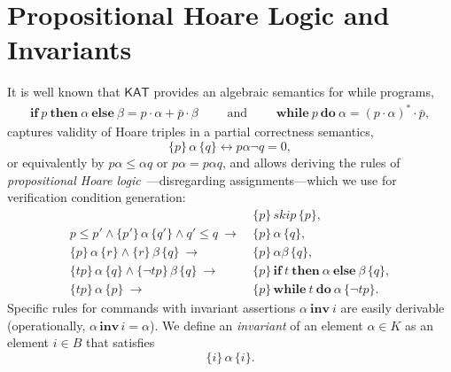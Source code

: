 \documentclass[envcountsames]{llncs}
\newcommand{\IF}[3]{\mathbf{if}\ #1\ \mathbf{then}\ #2\ \mathbf{else}\ #3}
\newcommand{\WHILE}[2]{\mathbf{while}\ #1\ \mathbf{do}\ #2}
\newcommand{\sskip}{\mathit{skip}}
\newcommand{\KAT}{\mathsf{KAT}}
\begin{document}

\section{Propositional Hoare Logic and Invariants}\label{sec:hl-invariants}

It is well known that $\KAT$ provides an algebraic semantics for while
programs,
\begin{align*}
  \IF{p}{\alpha}{\beta} = p\cdot \alpha + \bar p \cdot
  \beta\qquad\text{ and }\qquad
\WHILE{p}{\alpha} = (p\cdot \alpha)^\ast \cdot \bar p,
\end{align*}
captures validity of Hoare triples in
a partial correctness semantics,
\begin{equation*}
  \{p\}\, \alpha\, \{q\} \leftrightarrow p\alpha\neg q = 0,
\end{equation*}
or equivalently by $p\alpha\le \alpha q$ or $p\alpha = p\alpha q$, and
allows deriving the rules of \emph{propositional Hoare
  logic}~\cite{Kozen00}---disregarding assignments---which we use for
verification condition generation:
\begin{align}
  &\{p\}\, \sskip\, \{p\}, \label{eq:h-skip}\tag{h-skip}\\
  p\le p' \land \{p'\}\, \alpha\, \{q'\} \land q'\le q\ \rightarrow\ &
                                                                       \{p\}\,
                                                                       \alpha\,
                                                                       \{q\},\label{eq:h-cons}\tag{h-cons}\\
  \{p\}\, \alpha\, \{r\} \land \{r\}\, \beta\, \{q\}\ \rightarrow\
  &\{p\}\, \alpha\beta\, \{q\},\label{eq:h-seq}\tag{h-seq}\\
  \{tp\}\, \alpha\, \{q\}\land \{\neg tp\}\, \beta\, \{q\}\
  \rightarrow\ & \{p\}\, \IF{t}{\alpha}{\beta}\, \{q\},\label{eq:h-cond}\tag{h-cond}\\
  \{tp\}\, \alpha\, \{p\}\ \rightarrow\ & \{p\}\, \WHILE{t}{\alpha}\, \{\neg tp\}.\label{eq:h-while}\tag{h-while}
\end{align}
Specific rules for commands with invariant assertions
$\alpha\ \mathbf{inv}\ i$ are easily derivable (operationally,
$\alpha\, \mathbf{inv}\, i = \alpha$).  We define an \emph{invariant}
of an element $\alpha\in K$ as an element $i\in B$ that satisfies
\begin{equation*}
  \{i\}\, \alpha\, \{i\}.
\end{equation*}
\end{document}

